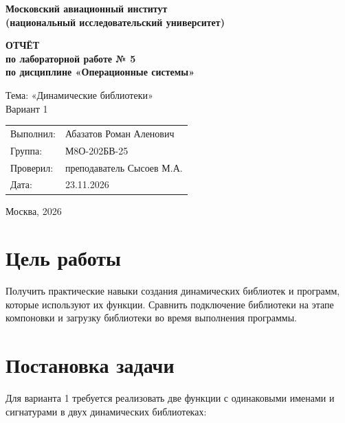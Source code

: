 \documentclass[12pt,a4paper]{article}
\begin{document}

\begin{titlepage}
\begin{center}
\textbf{Московский авиационный институт\\
(национальный исследовательский университет)}

\vspace{55mm}

\textbf{ОТЧЁТ\\
по лабораторной работе № 5\\
по дисциплине «Операционные системы»}

\vspace{8mm}

Тема: «Динамические библиотеки»\\
Вариант 1
\end{center}

\vspace{45mm}

\begin{flushright}
\begin{tabular}{ll}
Выполнил: & Абазатов Роман Аленович \\
Группа: & М8О-202БВ-25 \\
Проверил: & преподаватель Сысоев М.А. \\
Дата: & 23.11.2026 \\
\end{tabular}
\end{flushright}

\vfill

\begin{center}
Москва, 2026
\end{center}
\end{titlepage}

\section{Цель работы}

Получить практические навыки создания динамических библиотек и программ,
которые используют их функции. Сравнить подключение библиотеки на этапе
компоновки и загрузку библиотеки во время выполнения программы.

\section{Постановка задачи}

Для варианта 1 требуется реализовать две функции с одинаковыми именами и
сигнатурами в двух динамических библиотеках:
\end{document}
